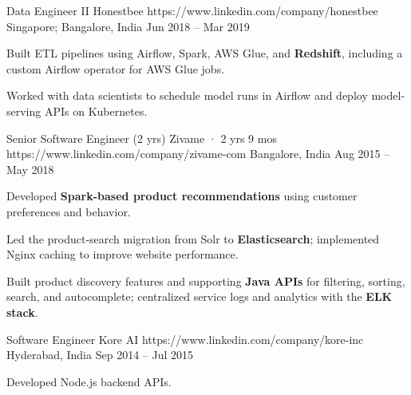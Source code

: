 \clearpage
{}
\begin{cventries}

\cventry
  {Data Engineer II}
  {Honestbee}
  {https://www.linkedin.com/company/honestbee}
  {Singapore; Bangalore, India}
  {Jun 2018 -- Mar 2019}
  {\begin{cvitems}
    \item {Built ETL pipelines using Airflow, Spark, AWS Glue, and \textbf{Redshift}, including a custom Airflow operator for AWS Glue jobs.}
    \item {Worked with data scientists to schedule model runs in Airflow and deploy model-serving APIs on Kubernetes.}
  \end{cvitems}}

\cventry
  {Senior Software Engineer (2 yrs)}
  {Zivame · 2 yrs 9 mos}
  {https://www.linkedin.com/company/zivame-com}
  {Bangalore, India}
  {Aug 2015 -- May 2018}
  {\begin{cvitems}
    \item {Developed \textbf{Spark-based product recommendations} using customer preferences and behavior.}
    \item {Led the product-search migration from Solr to \textbf{Elasticsearch}; implemented Nginx caching to improve website performance.}
    \item {Built product discovery features and supporting \textbf{Java APIs} for filtering, sorting, search, and autocomplete; centralized service logs and analytics with the \textbf{ELK stack}.}
  \end{cvitems}}

\cventry
  {Software Engineer}
  {Kore AI}
  {https://www.linkedin.com/company/kore-inc}
  {Hyderabad, India}
  {Sep 2014 -- Jul 2015}
  {\begin{cvitems}
    \item {Developed Node.js backend APIs.}
  \end{cvitems}}

\end{cventries}
